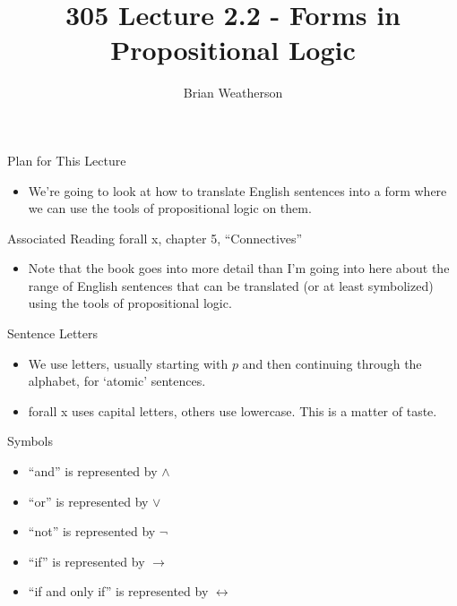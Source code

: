 \documentclass[
  ignorenonframetext,
]{beamer}
\title{305 Lecture 2.2 - Forms in Propositional Logic}
\author{Brian Weatherson}
\date{}
\providecommand{\tightlist}{%
  \setlength{\itemsep}{0pt}\setlength{\parskip}{0pt}}
\renewcommand{\,}{\text{, }}
\begin{document}
\frame{\titlepage}

\begin{frame}{Plan for This Lecture}
\protect\hypertarget{plan-for-this-lecture}{}
\begin{itemize}
\tightlist
\item
  We're going to look at how to translate English sentences into a form
  where we can use the tools of propositional logic on them.
\end{itemize}
\end{frame}

\begin{frame}{Associated Reading}
\protect\hypertarget{associated-reading}{}
forall x, chapter 5, ``Connectives''

\begin{itemize}
\tightlist
\item
  Note that the book goes into more detail than I'm going into here
  about the range of English sentences that can be translated (or at
  least symbolized) using the tools of propositional logic.
\end{itemize}
\end{frame}

\begin{frame}{Sentence Letters}
\protect\hypertarget{sentence-letters}{}
\begin{itemize}
\tightlist
\item
  We use letters, usually starting with \(p\) and then continuing
  through the alphabet, for `atomic' sentences.
\item
  forall x uses capital letters, others use lowercase. This is a matter
  of taste.
\end{itemize}
\end{frame}

\begin{frame}{Symbols}
\protect\hypertarget{symbols}{}
\begin{itemize}
\tightlist
\item
  ``and'' is represented by \(\wedge\)
\item
  ``or'' is represented by \(\vee\)
\item
  ``not'' is represented by \(\neg\)
\item
  ``if'' is represented by \(\rightarrow\)
\item
  ``if and only if'' is represented by \(\leftrightarrow\)
\end{itemize}
\end{frame}
\end{document}
